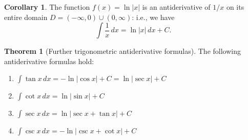 \documentclass[11pt]{article}
\theoremstyle{definition}
\newtheorem*{corollary}{Corollary}
\theoremstyle{named}
\newtheorem*{namedtheorem}{Theorem}
\numberwithin{myalgctr}{section}
\begin{document}
\begin{corollary}
  The function $f(x)=\ln\lvert x\rvert$ is an antiderivative of $1/x$ on its entire domain $D=(-\infty, 0)\cup (0,\infty)$: i.e., we have
  \[
  \int\frac{1}{x}\, dx=\ln \vert x\rvert\, dx+C.
  \]
\end{corollary}
\begin{namedtheorem}[Further trigonometric antiderivative formulas]
  The following antiderivative formulas hold:
  \begin{enumerate}
    \item $\displaystyle\int \tan x\, dx=-\ln\lvert \cos x\rvert+C=\ln\lvert\sec x\rvert+C$
    \item $\displaystyle\int \cot x\, dx=\ln\vert \sin x\vert+C$
    \item $\displaystyle\int \sec x\, dx=\ln\vert \sec x+\tan x\vert+C$
    \item $\displaystyle\int \csc x\, dx=-\ln\vert \csc x+\cot x\vert+C$
  \end{enumerate}

\end{namedtheorem}



%
\end{document}
